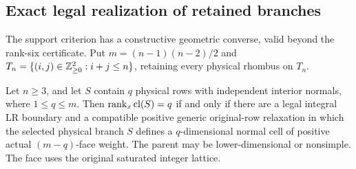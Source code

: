 \subsection{Exact legal realization of retained branches}\label{sec:realization}
The support criterion has a constructive geometric converse, valid beyond
the rank-six certificate. Put \(m=(n-1)(n-2)/2\) and
\(T_n=\{(i,j)\in\mathbb Z_{\geq0}^2:i+j\leq n\}\), retaining every physical
rhombus on \(T_n\).

\begin{theorem}\label{thm:realization}
Let \(n\geq3\), and let \(S\) contain \(q\) physical rows with independent
interior normals, where \(1\leq q\leq m\). Then \(\operatorname{rank}_x\operatorname{cl}(S)=q\) if
and only if there are a legal integral LR boundary and a compatible positive
generic original-row relaxation in which the selected physical branch \(S\)
defines a \(q\)-dimensional normal cell of positive actual
\((m-q)\)-face weight. The parent may be lower-dimensional or nonsimple.
The face uses the original saturated integer lattice.
\end{theorem}

